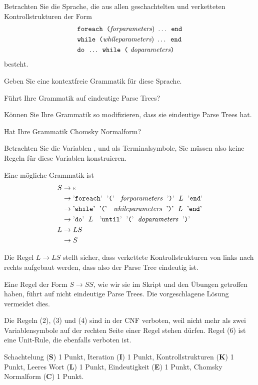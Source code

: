 Betrachten Sie die Sprache, die aus allen geschachtelten
und verketteten Kontrollstrukturen der Form
\begin{align*}
&\texttt{foreach (} \text{\em forparameters}\text{) } \dots \texttt{ end}
\\
&\texttt{while (} \text{\em whileparameters}\text{) } \dots \texttt{ end}
\\
&\texttt{do } \dots \texttt{ while (}\text{ \em doparameters\tt)}
\end{align*}
besteht.
\begin{teilaufgaben}
\item 
Geben Sie eine kontextfreie Grammatik für diese Sprache.
\item 
Führt Ihre Grammatik auf eindeutige Parse Trees?
\item 
Können Sie Ihre Grammatik so modifizieren, dass sie eindeutige Parse Trees hat.
\item 
Hat Ihre Grammatik Chomsky Normalform?
\end{teilaufgaben}

\begin{hinweis}
Betrachten Sie die Variablen
,
 und
als Terminalsymbole, Sie müssen also keine Regeln für diese Variablen
konstruieren.
\end{hinweis}


\begin{loesung}
\begin{teilaufgaben}
\item
Eine mögliche Grammatik ist
\begin{align}
S&\rightarrow \varepsilon
\\
 &\rightarrow
\text{'{\tt foreach}'\; '{\tt (}' \; {\em forparameters}\; '{\tt)}'\;
$L$
\;'{\tt end}'}
\\
 &\rightarrow
\text{'{\tt while}'\; '{\tt (}' \; {\em whileparameters}\; '{\tt)}'\;
$L$
\;'{\tt end}'}
\\
 &\rightarrow
\text{'{\tt do}'\;
$L$
\; '{\tt until}'\; '{\tt (}'\; {\em doparameters}\;
'{\tt)}'}
\\
L&\rightarrow LS
\\
 &\rightarrow S
\\
\end{align}
\item
Die Regel $L\to LS$ stellt sicher, dass verkettete Kontrollstrukturen
von links nach rechts aufgebaut werden, dass also der Parse Tree eindeutig ist.
\item
Eine Regel der Form $S\to SS$, wie wir sie im Skript und den Übungen
getroffen haben, führt auf nicht eindeutige Parse Trees.
Die vorgeschlagene Lösung vermeidet dies.
\item
Die Regeln (2), (3) und (4) sind in der CNF verboten,
weil nicht mehr als zwei Variablensymbole auf der rechten Seite einer Regel
stehen dürfen.
Regel (6) ist eine Unit-Rule, die ebenfalls verboten ist.
\qedhere
\end{teilaufgaben}
\end{loesung}

\begin{bewertung}
Schachtelung ({\bf S}) 1 Punkt,
Iteration ({\bf I}) 1 Punkt,
Kontrollstrukturen ({\bf K}) 1 Punkt,
Leeres Wort ({\bf L}) 1 Punkt,
Eindeutigkeit ({\bf E}) 1 Punkt,
Chomsky Normalform ({\bf C}) 1 Punkt.
\end{bewertung}


